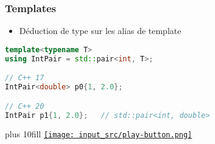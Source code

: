 \documentclass[C++.tex]{subfiles}
\begin{document}
\begin{frame}[fragile]
	\frametitle{Templates}
	\begin{itemize}
		\item Déduction de type sur les alias de template
	\end{itemize}

	\begin{lstlisting}[language=C++]
template<typename T>
using IntPair = std::pair<int, T>;

// C++ 17
IntPair<double> p0{1, 2.0}; 

// C++ 20
IntPair p1{1, 2.0};   // std::pair<int, double>\end{lstlisting}

	\vskip 10mm plus 10fill
	\hfill
	\href{https://godbolt.org/#g:!((g:!((g:!((h:codeEditor,i:(filename:'1',fontScale:14,fontUsePx:'0',j:1,lang:c%2B%2B,selection:(endColumn:1,endLineNumber:12,positionColumn:1,positionLineNumber:12,selectionStartColumn:1,selectionStartLineNumber:1,startColumn:1,startLineNumber:1),source:'%23include+%3Ciostream%3E%0A%23include+%3Cutility%3E%0A%0Atemplate%3Ctypename+T%3E%0Ausing+IntPair+%3D+std::pair%3Cint,+T%3E%3B%0A%0Aint+main()%0A%7B%0A++IntPair%3Cdouble%3E+p0%7B1,+2.0%7D%3B+%0A++IntPair+p1%7B1,+2.0%7D%3B+%0A%7D%0A'),l:'5',n:'0',o:'C%2B%2B+source+%231',t:'0')),k:50,l:'4',n:'0',o:'',s:0,t:'0'),(g:!((h:executor,i:(argsPanelShown:'1',compilationPanelShown:'0',compiler:g122,compilerName:'',compilerOutShown:'0',execArgs:'',execStdin:'',fontScale:14,fontUsePx:'0',j:1,lang:c%2B%2B,libs:!((name:boost,ver:'175')),options:'-std%3Dc%2B%2B20+-Wall+-Wextra+-pedantic',source:1,stdinPanelShown:'1',tree:'1',wrap:'0'),l:'5',n:'0',o:'Executor+x86-64+gcc+12.2+(C%2B%2B,+Editor+%231)',t:'0')),header:(),k:50,l:'4',n:'0',o:'',s:0,t:'0')),l:'2',n:'0',o:'',t:'0')),version:4}{\texttt{[image: input\_src/play-button.png]}}
\end{frame}
\end{document}
